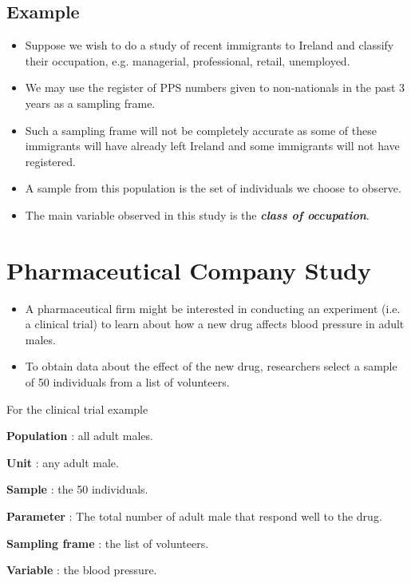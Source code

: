 \documentclass[a4paper,12pt]{article}
\begin{document}
\subsection{Example}
\begin{itemize}
\item Suppose we wish to do a study of recent immigrants to Ireland and
classify their occupation, e.g. managerial, professional, retail,
unemployed.
\item 
We may use the register of PPS numbers given to non-nationals in
the past 3 years as a sampling frame.
\item 
Such a sampling frame will not be completely accurate as some of
these immigrants will have already left Ireland and some
immigrants will not have registered.
\item 
A sample from this population is the set of individuals we choose
to observe.
\item 
The main variable observed in this study is the \textbf{\textit{class of occupation}}.
\end{itemize}


\section{Pharmaceutical Company Study}
\begin{itemize}
	\item A pharmaceutical firm might be interested in conducting an
	experiment (i.e. a clinical trial) to learn about how a new drug affects blood
	pressure in adult males. 
	
	\item To obtain data about the effect of the
	new drug, researchers select a sample of 50 individuals from a
	list of volunteers.
\end{itemize}


For the clinical trial example
\begin{framed}
\begin{multicols}{2}
\begin{description}
	\item \textbf{Population} : all adult males.

\item \textbf{Unit} : any adult male.
\item \textbf{Sample} : the 50 individuals.
\item \textbf{Parameter} : The total
number of adult male that respond well to the drug.
\item \textbf{Sampling frame} : the list of volunteers.
\item \textbf{Variable} : the blood pressure.
\end{description}
\end{multicols}
\end{framed}
\end{document}
